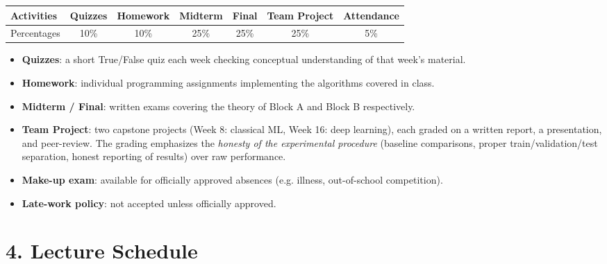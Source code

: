 \documentclass[11pt]{article}
\begin{document}
\begin{center}
\begin{tabular}{@{}lcccccc@{}}
\toprule
Activities & Quizzes & Homework & Midterm & Final & Team Project & Attendance \\
\midrule
Percentages & 10\% & 10\% & 25\% & 25\% & 25\% & 5\% \\
\bottomrule
\end{tabular}
\end{center}

\begin{itemize}[nosep]
\item \textbf{Quizzes}: a short True/False quiz each week checking
  conceptual understanding of that week's material.
\item \textbf{Homework}: individual programming assignments implementing
  the algorithms covered in class.
\item \textbf{Midterm / Final}: written exams covering the theory of
  Block A and Block B respectively.
\item \textbf{Team Project}: two capstone projects (Week 8: classical ML,
  Week 16: deep learning), each graded on a written report, a
  presentation, and peer-review. The grading emphasizes the
  \emph{honesty of the experimental procedure} (baseline comparisons,
  proper train/validation/test separation, honest reporting of results)
  over raw performance.
\item \textbf{Make-up exam}: available for officially approved absences
  (e.g. illness, out-of-school competition).
\item \textbf{Late-work policy}: not accepted unless officially approved.
\end{itemize}

\section*{4. Lecture Schedule}
\end{document}
